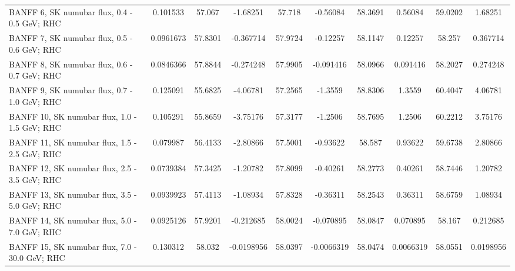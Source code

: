 \begin{tabular}{| l | S | S  S | S  S | S  S | S  S | }
                                   BANFF  6, SK numubar flux, 0.4 - 0.5 GeV; RHC &        0.101533 &          57.067 &        -1.68251 &          57.718 &        -0.56084 &         58.3691 &         0.56084 &         59.0202 &         1.68251 \\ 
                                   BANFF  7, SK numubar flux, 0.5 - 0.6 GeV; RHC &       0.0961673 &         57.8301 &       -0.367714 &         57.9724 &        -0.12257 &         58.1147 &         0.12257 &          58.257 &        0.367714 \\ 
                                   BANFF  8, SK numubar flux, 0.6 - 0.7 GeV; RHC &       0.0846366 &         57.8844 &       -0.274248 &         57.9905 &       -0.091416 &         58.0966 &        0.091416 &         58.2027 &        0.274248 \\ 
                                   BANFF  9, SK numubar flux, 0.7 - 1.0 GeV; RHC &        0.125091 &         55.6825 &        -4.06781 &         57.2565 &         -1.3559 &         58.8306 &          1.3559 &         60.4047 &         4.06781 \\ 
                                   BANFF 10, SK numubar flux, 1.0 - 1.5 GeV; RHC &        0.105291 &         55.8659 &        -3.75176 &         57.3177 &         -1.2506 &         58.7695 &          1.2506 &         60.2212 &         3.75176 \\ 
                                   BANFF 11, SK numubar flux, 1.5 - 2.5 GeV; RHC &        0.079987 &         56.4133 &        -2.80866 &         57.5001 &        -0.93622 &          58.587 &         0.93622 &         59.6738 &         2.80866 \\ 
                                   BANFF 12, SK numubar flux, 2.5 - 3.5 GeV; RHC &       0.0739384 &         57.3425 &        -1.20782 &         57.8099 &        -0.40261 &         58.2773 &         0.40261 &         58.7446 &         1.20782 \\ 
                                   BANFF 13, SK numubar flux, 3.5 - 5.0 GeV; RHC &       0.0939923 &         57.4113 &        -1.08934 &         57.8328 &        -0.36311 &         58.2543 &         0.36311 &         58.6759 &         1.08934 \\ 
                                   BANFF 14, SK numubar flux, 5.0 - 7.0 GeV; RHC &       0.0925126 &         57.9201 &       -0.212685 &         58.0024 &       -0.070895 &         58.0847 &        0.070895 &          58.167 &        0.212685 \\ 
                                  BANFF 15, SK numubar flux, 7.0 - 30.0 GeV; RHC &        0.130312 &          58.032 &      -0.0198956 &         58.0397 &      -0.0066319 &         58.0474 &       0.0066319 &         58.0551 &       0.0198956 \\ 

\end{tabular}
